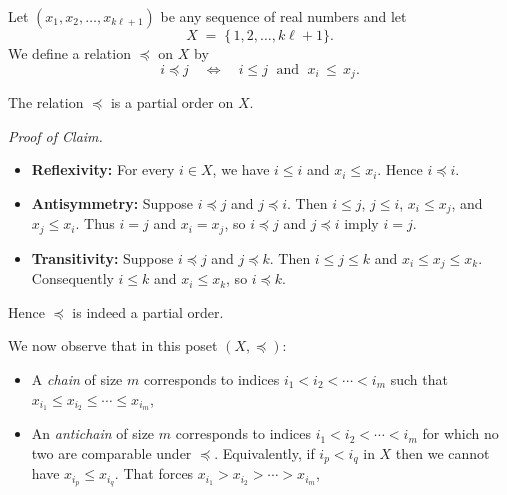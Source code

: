\documentclass{report}
\begin{document}
\begin{proofWithHibiscus}
  Let $(x_1, x_2, \ldots, x_{k\ell + 1})$ be any sequence of real numbers and let 
  \[
    X \;=\; \{\,1,2,\ldots, k\ell + 1\}.
  \]
  We define a relation $\preceq$ on $X$ by 
  \[
    i \preceq j 
    \quad\Longleftrightarrow\quad 
    i \le j 
    \;\text{ and }\;
    x_i \,\le\, x_j.
  \]
  \smallskip

  \begin{ClaimWithMagnolia}
    The relation $\preceq$ is a partial order on $X$.
    
    \medskip
    \noindent
    \emph{Proof of Claim.} 
    \begin{itemize}
      \item \textbf{Reflexivity:} 
      For every $i \in X$, we have $i \le i$ and $x_i \le x_i$. Hence $i \preceq i$.
      
      \item \textbf{Antisymmetry:} 
      Suppose $i \preceq j$ and $j \preceq i$. Then $i \le j$, $j \le i$, $x_i \le x_j$, and $x_j \le x_i$. 
      Thus $i = j$ and $x_i = x_j$, so $i \preceq j$ and $j \preceq i$ imply $i=j$.
      
      \item \textbf{Transitivity:} 
      Suppose $i \preceq j$ and $j \preceq k$. Then $i \le j \le k$ and 
      $x_i \le x_j \le x_k$. Consequently $i \le k$ and $x_i \le x_k$, so $i \preceq k$.
    \end{itemize}
    Hence $\preceq$ is indeed a partial order.
  \end{ClaimWithMagnolia}

  \medskip
  We now observe that in this poset $(X, \preceq)$:
  \begin{itemize}
    \item A \emph{chain} of size $m$ corresponds to indices 
      $i_1 < i_2 < \cdots < i_m$ such that 
      $x_{i_1} \le x_{i_2} \le \cdots \le x_{i_m}$,
    \item An \emph{antichain} of size $m$ corresponds to indices 
      $i_1 < i_2 < \cdots < i_m$ for which no two are comparable under $\preceq$.  
      Equivalently, if $i_p < i_q$ in $X$ then we cannot have $x_{i_p} \le x_{i_q}$. 
      That forces $x_{i_1} > x_{i_2} > \cdots > x_{i_m}$, 
  \end{itemize}


\end{proofWithHibiscus}
\end{document}
